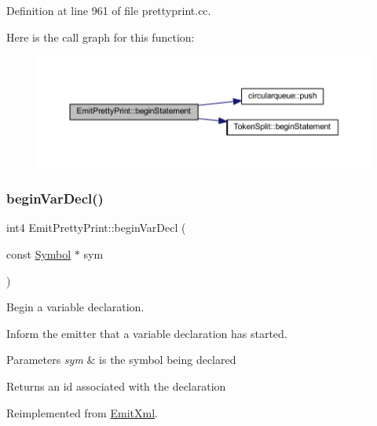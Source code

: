 Definition at line 961 of file prettyprint.\+cc.

Here is the call graph for this function\+:
\nopagebreak
\begin{figure}[H]
\begin{center}
\leavevmode
\includegraphics[width=350pt]{class_emit_pretty_print_a5100568fd6f499acafd9b7f47b700153_cgraph}
\end{center}
\end{figure}
\mbox{\label{class_emit_pretty_print_a9df518db8bdc76a0327a05cc26701459}} 
\subsubsection{\texorpdfstring{beginVarDecl()}{beginVarDecl()}}
{\footnotesize\ttfamily int4 Emit\+Pretty\+Print\+::begin\+Var\+Decl (\begin{DoxyParamCaption}\item[{const \mbox{\hyperlink{class_symbol}{Symbol}} $\ast$}]{sym }\end{DoxyParamCaption})\hspace{0.3cm}{\ttfamily [virtual]}}



Begin a variable declaration. 

Inform the emitter that a variable declaration has started. 
\begin{DoxyParams}{Parameters}
{\em sym} & is the symbol being declared \\
\hline
\end{DoxyParams}
\begin{DoxyReturn}{Returns}
an id associated with the declaration 
\end{DoxyReturn}


Reimplemented from \mbox{\hyperlink{class_emit_xml_a039212bc4a27cf56f1c70acd4d4623b6}{Emit\+Xml}}.



